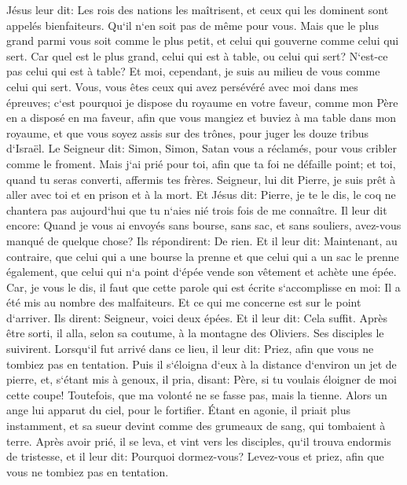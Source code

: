 \verse Jésus leur dit: Les rois des nations les maîtrisent, et ceux qui les dominent sont appelés bienfaiteurs. 
\verse Qu`il n`en soit pas de même pour vous. Mais que le plus grand parmi vous soit comme le plus petit, et celui qui gouverne comme celui qui sert. 
\verse Car quel est le plus grand, celui qui est à table, ou celui qui sert? N`est-ce pas celui qui est à table? Et moi, cependant, je suis au milieu de vous comme celui qui sert. 
\verse Vous, vous êtes ceux qui avez persévéré avec moi dans mes épreuves; 
\verse c`est pourquoi je dispose du royaume en votre faveur, comme mon Père en a disposé en ma faveur, 
\verse afin que vous mangiez et buviez à ma table dans mon royaume, et que vous soyez assis sur des trônes, pour juger les douze tribus d`Israël. 
\verse Le Seigneur dit: Simon, Simon, Satan vous a réclamés, pour vous cribler comme le froment. 
\verse Mais j`ai prié pour toi, afin que ta foi ne défaille point; et toi, quand tu seras converti, affermis tes frères. 
\verse Seigneur, lui dit Pierre, je suis prêt à aller avec toi et en prison et à la mort. 
\verse Et Jésus dit: Pierre, je te le dis, le coq ne chantera pas aujourd`hui que tu n`aies nié trois fois de me connaître. 
\verse Il leur dit encore: Quand je vous ai envoyés sans bourse, sans sac, et sans souliers, avez-vous manqué de quelque chose? Ils répondirent: De rien. 
\verse Et il leur dit: Maintenant, au contraire, que celui qui a une bourse la prenne et que celui qui a un sac le prenne également, que celui qui n`a point d`épée vende son vêtement et achète une épée. 
\verse Car, je vous le dis, il faut que cette parole qui est écrite s`accomplisse en moi: Il a été mis au nombre des malfaiteurs. Et ce qui me concerne est sur le point d`arriver. 
\verse Ils dirent: Seigneur, voici deux épées. Et il leur dit: Cela suffit. 
\verse Après être sorti, il alla, selon sa coutume, à la montagne des Oliviers. Ses disciples le suivirent. 
\verse Lorsqu`il fut arrivé dans ce lieu, il leur dit: Priez, afin que vous ne tombiez pas en tentation. 
\verse Puis il s`éloigna d`eux à la distance d`environ un jet de pierre, et, s`étant mis à genoux, il pria, 
\verse disant: Père, si tu voulais éloigner de moi cette coupe! Toutefois, que ma volonté ne se fasse pas, mais la tienne. 
\verse Alors un ange lui apparut du ciel, pour le fortifier. 
\verse Étant en agonie, il priait plus instamment, et sa sueur devint comme des grumeaux de sang, qui tombaient à terre. 
\verse Après avoir prié, il se leva, et vint vers les disciples, qu`il trouva endormis de tristesse, 
\verse et il leur dit: Pourquoi dormez-vous? Levez-vous et priez, afin que vous ne tombiez pas en tentation. 
